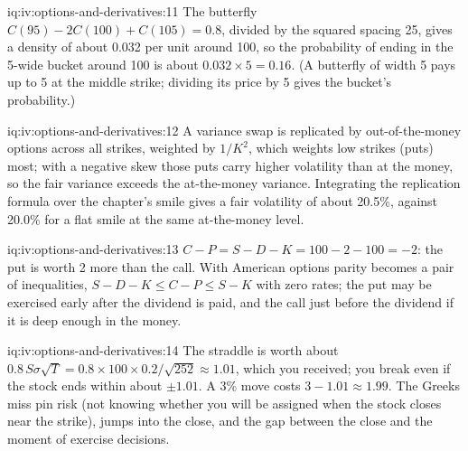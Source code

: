 \begin{solution}{iq:iv:options-and-derivatives:11}
The butterfly $C(95) - 2C(100) + C(105) = 0.8$, divided by the squared spacing 25, gives a density of about 0.032 per unit
around 100, so the probability of ending in the 5-wide bucket around 100 is about $0.032 \times 5 = 0.16$. (A butterfly of
width 5 pays up to 5 at the middle strike; dividing its price by 5 gives the bucket's probability.)
\end{solution}

\begin{solution}{iq:iv:options-and-derivatives:12}
A variance swap is replicated by out-of-the-money options across all strikes, weighted by $1/K^2$, which weights low strikes (puts)
most; with a negative skew those puts carry higher volatility than at the money, so the fair variance exceeds the
at-the-money variance. Integrating the replication formula over the chapter's smile gives a fair volatility of about
20.5\%, against 20.0\% for a flat smile at the same at-the-money level.
\end{solution}

\begin{solution}{iq:iv:options-and-derivatives:13}
$C - P = S - D - K = 100 - 2 - 100 = -2$: the put is worth 2 more than the call. With American options parity becomes a pair
of inequalities, $S - D - K \le C - P \le S - K$ with zero rates; the put may be exercised early after the dividend is paid,
and the call just before the dividend if it is deep enough in the money.
\end{solution}

\begin{solution}{iq:iv:options-and-derivatives:14}
The straddle is worth about $0.8\,S\sigma\sqrt{T} = 0.8 \times 100 \times 0.2/\sqrt{252} \approx 1.01$, which you received; you
break even if the stock ends within about $\pm 1.01$. A 3\% move costs $3 - 1.01 \approx 1.99$. The Greeks miss pin risk (not
knowing whether you will be assigned when the stock closes near the strike), jumps into the close, and the gap between the
close and the moment of exercise decisions.
\end{solution}
